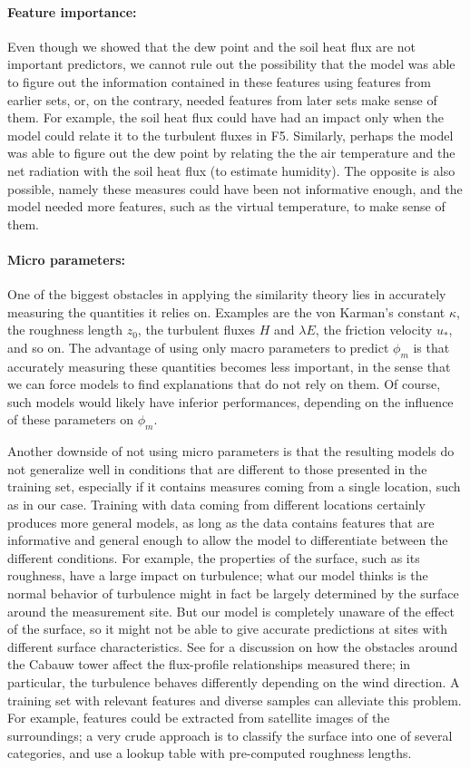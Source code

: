 \documentclass[a4paper]{book}
\begin{document}
\paragraph{Feature importance:} Even though we showed that the dew point and the soil heat flux are not important predictors, we cannot rule out the possibility that the model was able to figure out the information contained in these features using features from earlier sets, or, on the contrary, needed features from later sets make sense of them. For example, the soil heat flux could have had an impact only when the model could relate it to the turbulent fluxes in F5. Similarly, perhaps the model was able to figure out the dew point by relating the the air temperature and the net radiation with the soil heat flux (to estimate humidity). The opposite is also possible, namely these measures could have been not informative enough, and the model needed more features, such as the virtual temperature, to make sense of them.

\paragraph{Micro parameters:} One of the biggest obstacles in applying the similarity theory lies in accurately measuring the quantities it relies on. Examples are the von Karman's constant $\kappa$, the roughness length $z_0$, the turbulent fluxes $H$ and $\lambda E$, the friction velocity $u_*$, and so on. The advantage of using only macro parameters to predict $\phi_m$ is that accurately measuring these quantities becomes less important, in the sense that we can force models to find explanations that do not rely on them. Of course, such models would likely have inferior performances, depending on the influence of these parameters on $\phi_m$.

Another downside of not using micro parameters is that the resulting models do not generalize well in conditions that are different to those presented in the training set, especially if it contains measures coming from a single location, such as in our case. Training with data coming from different locations certainly produces more general models, as long as the data contains features that are informative and general enough to allow the model to differentiate between the different conditions. For example, the properties of the surface, such as its roughness, have a large impact on turbulence; what our model thinks is the normal behavior of turbulence might in fact be largely determined by the surface around the measurement site. But our model is completely unaware of the effect of the surface, so it might not be able to give accurate predictions at sites with different surface characteristics. See \cite{cabauw_surface} for a discussion on how the obstacles around the Cabauw tower affect the flux-profile relationships measured there; in particular, the turbulence behaves differently depending on the wind direction. A training set with relevant features and diverse samples can alleviate this problem. For example, features could be extracted from satellite images of the surroundings; a very crude approach is to classify the surface into one of several categories, and use a lookup table with pre-computed roughness lengths.
\end{document}
